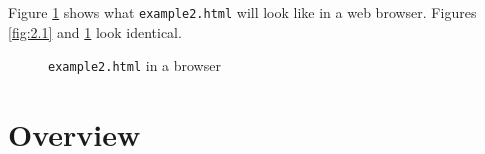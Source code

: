 \documentclass[a4paper, 12pt]{report}
\begin{document}
Figure \ref{fig:3.1} shows what \texttt{example2.html} will look like in a web browser. Figures \ref{fig:2.1} and \ref{fig:3.1} look identical.
\begin{figure}[h!]
\caption{\texttt{example2.html} in a browser}
\label{fig:3.1}
\end{figure}



\section{Overview}
\end{document}
